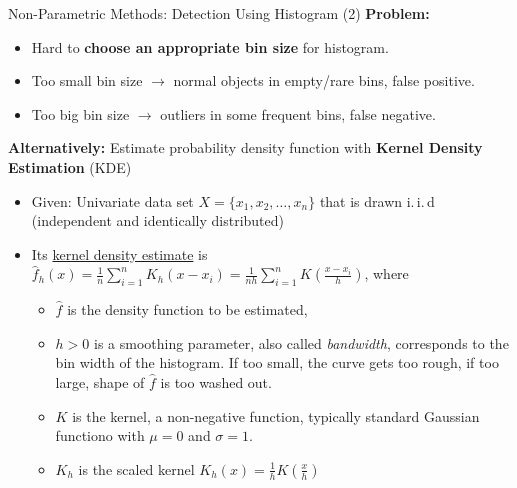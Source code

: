 \begin{frame}{Non-Parametric Methods: Detection Using Histogram (2)}
	\textbf{Problem:}
	\begin{itemize}
		\item Hard to \textbf{\color{airforceblue}choose an appropriate bin size} for histogram.
		\item Too small bin size $\rightarrow$ normal objects in empty/rare bins, false positive.
		\item Too big bin size $\rightarrow$ outliers in some frequent bins, false negative.
	\end{itemize}
	\vspace*{1em}
	\textbf{Alternatively:} Estimate probability density function with \textbf{Kernel Density Estimation} (KDE)
	\begin{itemize}
		\item Given: Univariate data set $X=\{x_1, x_2, \dots, x_n\}$ that is drawn i.\,i.\,d (independent and identically distributed)
		\item Its \underline{kernel density estimate} is $\hat{f}_h(x)=\frac{1}{n}\sum_{i=1}^n K_h(x-x_i) = \frac{1}{nh}\sum_{i=1}^n K(\frac{x-x_i}{h})$, where
		      \begin{itemize}
			      \item $\hat{f}$ is the density function to be estimated,
			      \item $h>0$ is a smoothing parameter, also called \textit{bandwidth}, corresponds to the bin width of the histogram. If too small, the curve gets too rough, if too large, shape of $\hat{f}$ is too washed out.
			      \item $K$ is the kernel, a non-negative function, typically standard Gaussian functiono with $\mu=0$ and $\sigma=1$.
			      \item $K_h$ is the scaled kernel $K_h(x)=\frac{1}{h} K(\frac{x}{h})$
		      \end{itemize}
	\end{itemize}
\end{frame}
